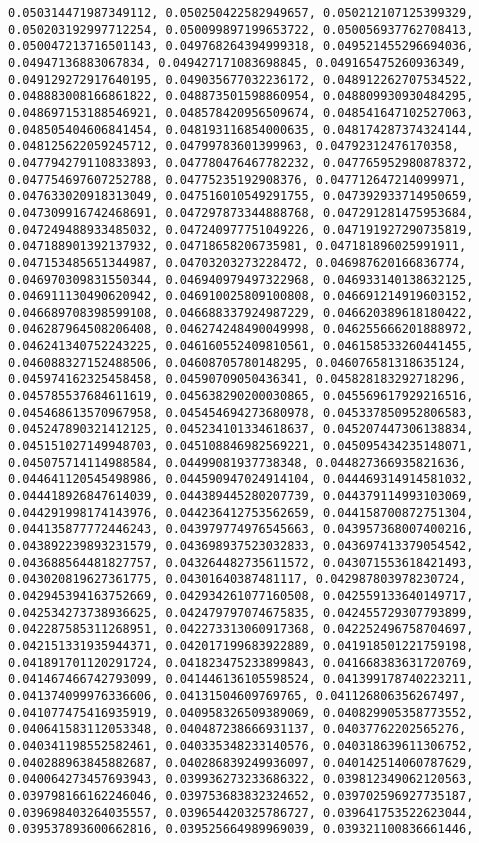\documentclass[11pt]{article}
\begin{document}
\begin{Verbatim}[commandchars=\\\{\}]
0.050314471987349112, 0.050250422582949657, 0.050212107125399329, 0.050203192997712254, 0.050099897199653722, 0.050056937762708413, 0.050047213716501143, 0.049768264394999318, 0.049521455296694036, 0.04947136883067834, 0.049427171083698845, 0.049165475260936349, 0.049129272917640195, 0.049035677032236172, 0.048912262707534522, 0.048883008166861822, 0.048873501598860954, 0.048809930930484295, 0.048697153188546921, 0.048578420956509674, 0.048541647102527063, 0.048505404606841454, 0.048193116854000635, 0.048174287374324144, 0.048125622059245712, 0.04799783601399963, 0.04792312476170358, 0.047794279110833893, 0.047780476467782232, 0.047765952980878372, 0.047754697607252788, 0.04775235192908376, 0.047712647214099971, 0.047633020918313049, 0.047516010549291755, 0.047392933714950659, 0.047309916742468691, 0.047297873344888768, 0.047291281475953684, 0.047249488933485032, 0.047240977751049226, 0.047191927290735819, 0.047188901392137932, 0.04718658206735981, 0.047181896025991911, 0.047153485651344987, 0.04703203273228472, 0.046987620166836774, 0.046970309831550344, 0.046940979497322968, 0.046933140138632125, 0.046911130490620942, 0.046910025809100808, 0.046691214919603152, 0.046689708398599108, 0.046688337924987229, 0.046620389618180422, 0.046287964508206408, 0.046274248490049998, 0.046255666201888972, 0.046241340752243225, 0.046160552409810561, 0.046158533260441455, 0.046088327152488506, 0.04608705780148295, 0.046076581318635124, 0.045974162325458458, 0.04590709050436341, 0.045828183292718296, 0.045785537684611619, 0.045638290200030865, 0.045569617929216516, 0.045468613570967958, 0.045454694273680978, 0.045337850952806583, 0.045247890321412125, 0.045234101334618637, 0.045207447306138834, 0.045151027149948703, 0.045108846982569221, 0.045095434235148071, 0.045075714114988584, 0.04499081937738348, 0.044827366935821636, 0.044641120545498986, 0.044590947024914104, 0.044469314914581032, 0.044418926847614039, 0.044389445280207739, 0.044379114993103069, 0.044291998174143976, 0.044236412753562659, 0.044158700872751304, 0.044135877772446243, 0.043979774976545663, 0.043957368007400216, 0.043892239893231579, 0.043698937523032833, 0.043697413379054542, 0.043688564481827757, 0.043264482735611572, 0.043071553618421493, 0.043020819627361775, 0.04301640387481117, 0.042987803978230724, 0.042945394163752669, 0.042934261077160508, 0.042559133640149717, 0.042534273738936625, 0.042479797074675835, 0.042455729307793899, 0.042287585311268951, 0.042273313060917368, 0.042252496758704697, 0.042151331935944371, 0.042017199683922889, 0.041918501221759198, 0.041891701120291724, 0.041823475233899843, 0.041668383631720769, 0.041467466742793099, 0.041446136105598524, 0.041399178740223211, 0.041374099976336606, 0.04131504609769765, 0.041126806356267497, 0.041077475416935919, 0.040958326509389069, 0.040829905358773552, 0.040641583112053348, 0.040487238666931137, 0.04037762202565276, 0.040341198552582461, 0.040335348233140576, 0.040318639611306752, 0.040288963845882687, 0.040286839249936097, 0.040142514060787629, 0.040064273457693943, 0.039936273233686322, 0.039812349062120563, 0.039798166162246046, 0.039753683832324652, 0.039702596927735187, 0.039698403264035557, 0.039654420325786727, 0.039641753522623044, 0.039537893600662816, 0.039525664989969039, 0.039321100836661446, 
\end{Verbatim}
\end{document}
